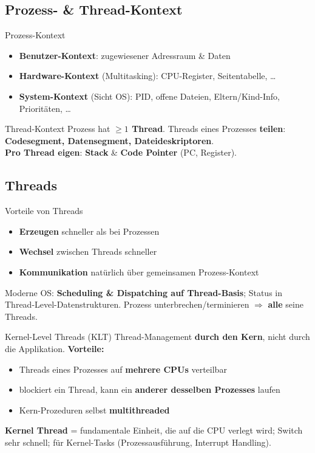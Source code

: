\documentclass[a4paper, fontsize=7pt]{scrartcl}
\begin{document}
\subsection{Prozess- \& Thread-Kontext}

\begin{mainbox}{Prozess-Kontext}
\begin{itemize}
    \item \textbf{Benutzer-Kontext}: zugewiesener Adressraum \& Daten
    \item \textbf{Hardware-Kontext} (Multitasking): CPU-Register,
          Seitentabelle, \ldots
    \item \textbf{System-Kontext} (Sicht OS): PID, offene Dateien,
          Eltern/Kind-Info, Prioritäten, \ldots
\end{itemize}
\end{mainbox}

\begin{mainbox}{Thread-Kontext}
Prozess hat \textbf{$\ge 1$ Thread}. Threads eines Prozesses
\textbf{teilen}: \textbf{Codesegment, Datensegment, Dateideskriptoren}.\\
\textbf{Pro Thread eigen}: \textbf{Stack} \& \textbf{Code Pointer}
(PC, Register).
\end{mainbox}

\subsection{Threads}

\begin{mainbox}{Vorteile von Threads}
\begin{itemize}
    \item \textbf{Erzeugen} schneller als bei Prozessen
    \item \textbf{Wechsel} zwischen Threads schneller
    \item \textbf{Kommunikation} natürlich über gemeinsamen
          Prozess-Kontext
\end{itemize}
Moderne OS: \textbf{Scheduling \& Dispatching auf Thread-Basis};
Status in Thread-Level-Datenstrukturen. Prozess unterbrechen/terminieren
$\Rightarrow$ \textbf{alle} seine Threads.
\end{mainbox}

\begin{mainbox}{Kernel-Level Threads (KLT)}
Thread-Management \textbf{durch den Kern}, nicht durch die Applikation.
\textbf{Vorteile:}
\begin{itemize}
    \item Threads eines Prozesses auf \textbf{mehrere CPUs} verteilbar
    \item blockiert ein Thread, kann ein \textbf{anderer desselben
          Prozesses} laufen
    \item Kern-Prozeduren selbst \textbf{multithreaded}
\end{itemize}
\textbf{Kernel Thread} = fundamentale Einheit, die auf die CPU verlegt
wird; Switch sehr schnell; für Kernel-Tasks (Prozessausführung,
Interrupt Handling).
\end{mainbox}
\end{document}
